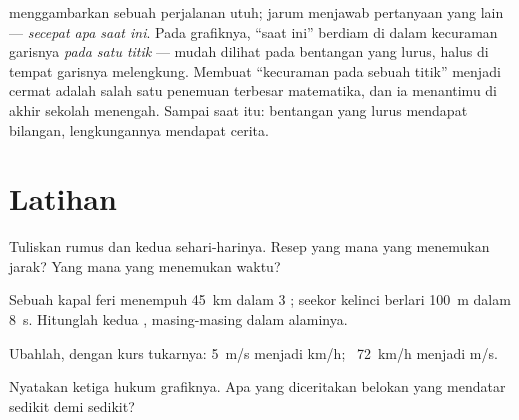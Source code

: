 \begin{remark}\label{rem:g7:motion-average-speed:speedometer}
 menggambarkan sebuah perjalanan utuh; jarum
 menjawab pertanyaan yang lain --- \emph{secepat apa saat
ini}. Pada grafiknya, ``saat ini'' berdiam di dalam kecuraman garisnya
\emph{pada satu titik} --- mudah dilihat pada bentangan yang lurus,
halus di tempat garisnya melengkung. Membuat ``kecuraman pada sebuah
titik'' menjadi cermat adalah salah satu penemuan terbesar matematika,
dan ia menantimu di akhir sekolah menengah. Sampai saat itu: bentangan
yang lurus mendapat bilangan, lengkungannya mendapat cerita.
\end{remark}

\section{Latihan}

\begin{exercise}[$\star$]\label{exo:g7:motion-average-speed:1}
Tuliskan rumus  dan kedua  sehari-harinya. Resep yang
mana yang menemukan jarak? Yang mana yang menemukan waktu?
\end{exercise}

\begin{exercise}[$\star$]\label{exo:g7:motion-average-speed:2}
Sebuah kapal feri menempuh \qty{45}{km} dalam $3$ ; seekor kelinci
berlari \qty{100}{m} dalam \qty{8}{s}. Hitunglah kedua ,
masing-masing dalam  alaminya.
\end{exercise}

\begin{exercise}[$\star$]\label{exo:g7:motion-average-speed:3}
Ubahlah, dengan kurs tukarnya: \qty{5}{m/s} menjadi \unit{km/h}; \
\qty{72}{km/h} menjadi \unit{m/s}.
\end{exercise}

\begin{exercise}[$\star$]\label{exo:g7:motion-average-speed:4}
Nyatakan ketiga hukum grafiknya. Apa yang diceritakan belokan yang
mendatar sedikit demi sedikit?
\end{exercise}

